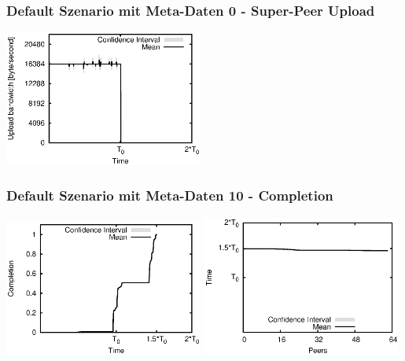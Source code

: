 \begin{frame}
  \frametitle{Default Szenario mit Meta-Daten 0 - Super-Peer Upload}
  \begin{center}
    \includegraphics[width=0.49\textwidth]{fig/plots/scenario_5_meta_data_0/plots/GeneratedMeanCurrentSuperSeederUploadBandwidth.csv.eps}
  \end{center}
\end{frame}




\begin{frame}
  \frametitle{Default Szenario mit Meta-Daten 10 - Completion}
  \begin{center}
    \includegraphics[width=0.49\textwidth]{fig/plots/scenario_10_meta_data_10/plots/GeneratedMeanChunkCompletion.csv.eps}
    \hfill
    \includegraphics[width=0.49\textwidth]{fig/plots/scenario_10_meta_data_10/plots/GeneratedMeanSortedChunkCompletion.csv.eps}
  \end{center}
\end{frame}


